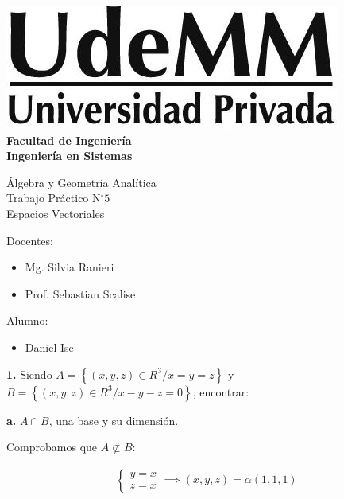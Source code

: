 \documentclass[12pt]{article}
\begin{document}
\thispagestyle{empty}

\begin{center}
  \vspace*{.5cm}
  \includegraphics[scale=0.4]{../../img/udemm-logo.png}\\
  \vspace{.2cm}
  \Large
  \textbf{Facultad de Ingeniería}\\
  \textbf{Ingeniería en Sistemas}\\
  \vspace{2cm}

  \Huge
  Álgebra y Geometría Analítica\\
  Trabajo Práctico N\(^{\circ} 5\) \\
  Espacios Vectoriales
  \vfill

  \raggedright
  \Large
  Docentes:
  \begin{itemize}
    \item[] Mg. Silvia Ranieri\\
    \item[] Prof. Sebastian Scalise\\
  \end{itemize}
  Alumno:
  \begin{itemize}
    \item[] Daniel Ise
  \end{itemize}
  \vspace{1cm}

\end{center}

\pagebreak

\textbf{1.}
Siendo \(A = \left\{(x,y,z) \in R^{3} / x = y = z\right\}\) y
\(B = \left\{(x,y,z) \in R^{3} / x-y-z=0\right\}\),
encontrar:

\hspace{6mm}\textbf{a.}
\(A \cap B\), una base y su dimensión.

Comprobamos que \(A \not \subset B\):

\begin{align*}
  \begin{cases}
    y = x \\
    z = x
  \end{cases} \implies (x,y,z) = \alpha (1,1,1)
\end{align*}
\end{document}
